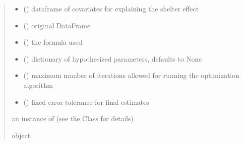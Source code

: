 \documentclass[letterpaper,10pt,english]{sphinxmanual}
\begin{document}
\begin{fulllineitems}
\begin{quote}
\begin{description}
\begin{itemize}
\item {} 
\sphinxAtStartPar
{} () \textendash{} dataframe of covariates for explaining the shelter effect

\item {} 
\sphinxAtStartPar
{} () \textendash{} original DataFrame

\item {} 
\sphinxAtStartPar
{} () \textendash{} the formula used

\item {} 
\sphinxAtStartPar
{} (\sphinxstyleliteralemphasis{\sphinxupquote{, }}) \textendash{} dictionary of hypothesized parameters, defaults to None

\item {} 
\sphinxAtStartPar
{} () \textendash{} maximum number of iterations allowed for running the optimization algorithm

\item {} 
\sphinxAtStartPar
{} () \textendash{} fixed error tolerance for final estimates

\end{itemize}

\sphinxAtStartPar
an instance of  (see the Class for details)

\sphinxAtStartPar
object

\end{description}\end{quote}

\end{fulllineitems}

\end{document}
